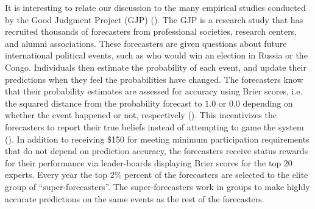 \documentclass[11pt]{article}
\theoremstyle{definition}
\theoremstyle{definition}
\begin{document}
It is interesting to relate our discussion to the many empirical studies conducted by the Good Judgment Project (GJP) (\cite{mellers2014psychological, ungar2012good}). The GJP is a research study that has recruited thousands of forecasters from professional societies, research centers, and alumni associations. These forecasters are given questions about future international political events, such as who would win an election in Russia or the Congo. Individuals then estimate the probability of each event, and update their predictions when they feel the probabilities have changed. The forecasters know that their probability estimates are assessed for accuracy using Brier scores, i.e. the squared distance from the  probability forecast to $1.0$ or $0.0$ depending on whether the event happened or not, respectively (\cite{Brier}). This incentivizes the forecasters to report their true beliefs instead of attempting to game the system (\citet{winkler1968good}). In addition to receiving \$150 for meeting minimum participation requirements that do not depend on prediction accuracy, the forecasters receive status rewards for their performance via leader-boards displaying Brier scores for the top 20 experts. Every year the top 2\% percent of the forecasters are selected to the elite group of ``super-forecasters''. The super-forecasters work in groups to make highly accurate predictions on the same events as the rest of the forecasters. 


\end{document}
